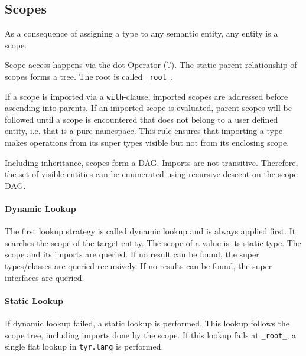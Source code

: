 \subsection{Scopes}

As a consequence of assigning a type to any semantic entity, any entity is a scope.

Scope access happens via the dot-Operator ('.').
The static parent relationship of scopes forms a tree.
The root is called \texttt{\_root\_}.

If a scope is imported via a \texttt{with}-clause, imported scopes are addressed before ascending into parents.
If an imported scope is evaluated, parent scopes will be followed until a scope is encountered that does not belong to a user defined entity, i.e. that is a pure namespace.
This rule ensures that importing a type makes operations from its super types visible but not from its enclosing scope.

Including inheritance, scopes form a DAG.
Imports are not transitive.
Therefore, the set of visible entities can be enumerated using recursive descent on the scope DAG.


\paragraph{Dynamic Lookup} The first lookup strategy is called dynamic lookup and is always applied first.
It searches the scope of the target entity.
The scope of a value is its static type.
The scope and its imports are queried.
If no result can be found, the super types/classes are queried recursively.
If no results can be found, the super interfaces are queried.


\paragraph{Static Lookup} If dynamic lookup failed, a static lookup is performed.
This lookup follows the scope tree, including imports done by the scope.
If this lookup fails at \texttt{\_root\_}, a single flat lookup in \texttt{tyr.lang} is performed.


